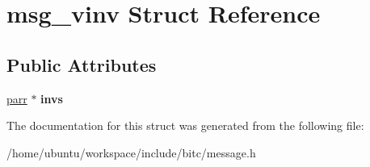 \hypertarget{structmsg__vinv}{\section{msg\-\_\-vinv Struct Reference}
\label{structmsg__vinv}
}
\subsection*{Public Attributes}
\begin{DoxyCompactItemize}
\item 
\hypertarget{structmsg__vinv_a6648d3e92cecc80fa81cb0c17a6104ea}{\hyperlink{structparr}{parr} $\ast$ {\bfseries invs}}\label{structmsg__vinv_a6648d3e92cecc80fa81cb0c17a6104ea}

\end{DoxyCompactItemize}


The documentation for this struct was generated from the following file\-:\begin{DoxyCompactItemize}
\item 
/home/ubuntu/workspace/include/bitc/message.\-h\end{DoxyCompactItemize}
